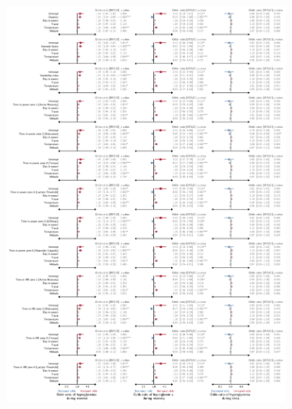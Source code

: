 \documentclass[11pt,a4paper]{article}
\begin{document}
\begin{figure}[hbtp]\ContinuedFloat
    \begin{subfigure}{\textwidth}
        \centering
        \caption{}
        \label{fig:reg-train-hyper-full}
        \includegraphics[width=\textwidth]{figure/train/coef_env_train_binomial_hyper.pdf}
    \end{subfigure}
\end{figure}

\end{document}
